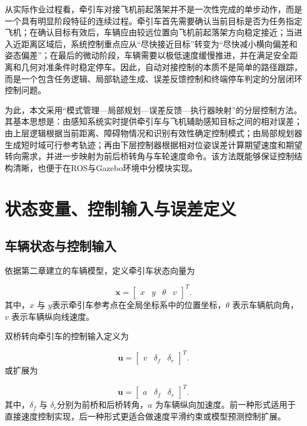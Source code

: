 从实际作业过程看，牵引车对接飞机前起落架并不是一次性完成的单步动作，而是一个具有明显阶段特征的连续过程。牵引车首先需要确认当前目标是否为任务指定飞机；在确认目标有效后，车辆应由较远位置向飞机前起落架方向稳定接近；当进入近距离区域后，系统控制重点应从``尽快接近目标''转变为``尽快减小横向偏差和姿态偏差''；在最后的微动阶段，车辆需要以极低速度缓慢推进，并在满足安全距离和几何对准条件时稳定停车。因此，自动对接控制的本质不是简单的路径跟踪，而是一个包含任务逻辑、局部轨迹生成、误差反馈控制和终端停车判定的分层闭环控制问题\cite{ref25,ref27,ref28}。

为此，本文采用``模式管理---局部规划---误差反馈---执行器映射''的分层控制方法。其基本思想是：由感知系统实时提供牵引车与飞机辅助感知目标之间的相对误差；由上层逻辑根据当前距离、障碍物情况和识别有效性确定控制模式；由局部规划器生成短时域可行参考轨迹；再由下层控制器根据相对位姿误差计算期望速度和期望转向需求，并进一步映射为前后桥转角与车轮速度命令。该方法既能够保证控制结构清晰，也便于在ROS与Gazebo环境中分模块实现\cite{ref11,ref12,ref13,ref14,ref15,ref16}。

\section{状态变量、控制输入与误差定义}

\subsection{车辆状态与控制输入}

依据第二章建立的车辆模型，定义牵引车状态向量为

\begin{equation}
\mathbf{x}=\begin{bmatrix}x & y & \theta & v\end{bmatrix}^{T}.
\label{eq:control_state}
\end{equation}
其中，\(x\) 与 \(y\)表示牵引车参考点在全局坐标系中的位置坐标，\(\theta\)
表示车辆航向角，\(v\) 表示车辆纵向线速度。

双桥转向牵引车的控制输入定义为

\begin{equation}
\mathbf{u}=\begin{bmatrix}v & \delta_f & \delta_r\end{bmatrix}^{T}.
\label{eq:control_input_velocity}
\end{equation}
或扩展为

\begin{equation}
\mathbf{u}=\begin{bmatrix}a & \delta_f & \delta_r\end{bmatrix}^{T}.
\label{eq:control_input_acceleration}
\end{equation}
其中，\(\delta_{f}\) 与 \(\delta_{r}\)分别为前桥和后桥转角，\(a\)
为车辆纵向加速度。前一种形式适用于直接速度控制实现，后一种形式更适合做速度平滑约束或模型预测控制扩展。

